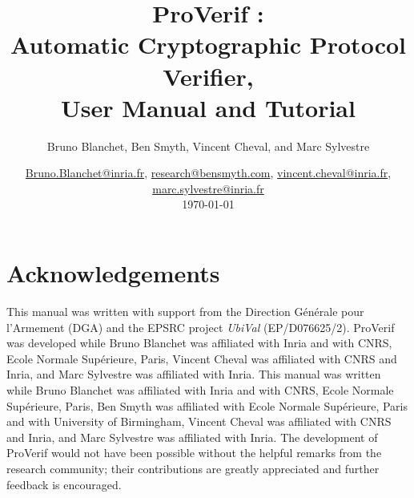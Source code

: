 \documentclass{book}
\title{ProVerif \V:\\
Automatic Cryptographic Protocol Verifier,\\
User Manual and Tutorial}
\author{Bruno Blanchet, Ben Smyth, Vincent Cheval, and Marc Sylvestre}
\date{\vskip -0.5cm \url{Bruno.Blanchet@inria.fr}, \url{research@bensmyth.com},
\url{vincent.cheval@inria.fr}, \url{marc.sylvestre@inria.fr}\\[0.75cm] \today}
\newcommand{\tblue}[1]{\textcolor{blue}{REMARK: \emph{#1}}}
\renewcommand{\marginpar}[1]{\tblue{#1}}
\begin{document}
\frontmatter                %
\maketitle

\chapter*{Acknowledgements}

This manual was written with support from the Direction G{\'e}n{\'e}rale pour l'Armement (DGA)
and the EPSRC project \emph{UbiVal} (EP/D076625/2).
ProVerif was developed while Bruno Blanchet was affiliated with Inria and with CNRS, Ecole Normale Supérieure, Paris, Vincent Cheval was affiliated with CNRS and Inria, and Marc Sylvestre was affiliated with Inria. This manual was written while Bruno Blanchet was affiliated with Inria and with CNRS, Ecole Normale Supérieure, Paris,  Ben Smyth was affiliated with Ecole Normale Supérieure, Paris and with University of Birmingham, Vincent Cheval was affiliated with CNRS and Inria, and Marc Sylvestre was affiliated with Inria.
The development of ProVerif would not have been possible without the helpful remarks from the research community; their contributions are greatly appreciated and further feedback is encouraged.



\tableofcontents
\listoffigures
\end{document}
